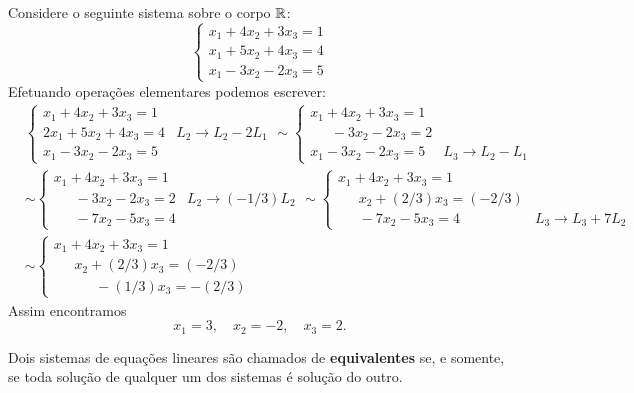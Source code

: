 \begin{exemplo}
Considere o seguinte sistema sobre o corpo $\mathbb{R}$:
\[
\begin{cases}
x_1 + 4x_2 + 3x_3 = 1\\
x_1 + 5x_2 + 4x_3 = 4\\
x_1 - 3x_2 - 2x_3 = 5
\end{cases}
\]
Efetuando opera\c{c}\~oes elementares podemos escrever:
\begin{align*}
&\begin{cases}
x_1 + 4x_2 + 3x_3 = 1\\
2x_1 + 5x_2 + 4x_3 = 4 & L_2 \rightarrow L_2 - 2L_1\\
x_1 - 3x_2 - 2x_3 = 5
\end{cases} \sim
\begin{cases}
x_1 + 4x_2 + 3x_3 = 1\\
\phantom{0x_1} -3x_2 - 2x_3 = 2\\
x_1 - 3x_2 - 2x_3 = 5 & L_3 \rightarrow L_2 - L_1
\end{cases}\\ & \sim
\begin{cases}
x_1 + 4x_2 + 3x_3 = 1\\
\phantom{0x_1} - 3x_2 - 2x_3 = 2 & L_2 \rightarrow (-1/3)L_2\\
\phantom{0x_1} - 7x_2 - 5x_3 = 4
\end{cases} \sim
\begin{cases}
x_1 + 4x_2 + 3x_3 = 1\\
\phantom{0x_1} x_2 + (2/3)x_3 = (-2/3)\\
\phantom{0x_1} - 7x_2 - 5x_3 = 4 & L_3 \rightarrow L_3 + 7L_2
\end{cases}\\ & \sim
\begin{cases}
x_1 + 4x_2 + 3x_3 = 1\\
\phantom{0x_1} x_2 + (2/3)x_3 = (-2/3)\\
\phantom{0x_1} \phantom{0x_2}  -(1/3)x_3 = -(2/3)
\end{cases}
\end{align*}
Assim encontramos
\[
x_1 = 3, \quad x_2 = -2, \quad x_3 = 2.
\]
\end{exemplo}

\begin{definicao}
Dois sistemas de equa\c{c}\~oes lineares s\~ao chamados de \textbf{equivalentes} se, e somente, se toda solu\c{c}\~ao de qualquer um dos sistemas \'e solu\c{c}\~ao do outro.
\end{definicao}


